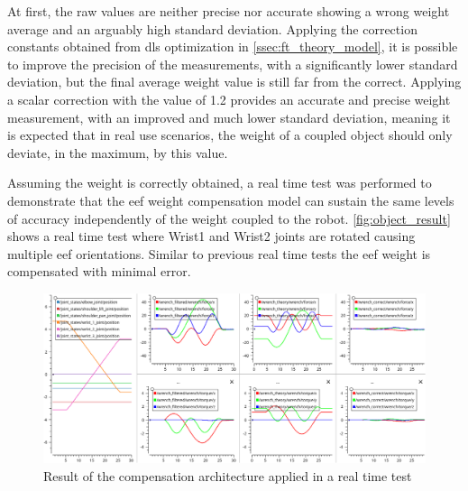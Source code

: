 \par At first, the raw values are neither precise nor accurate showing a wrong weight average and an arguably high standard deviation. Applying the correction constants obtained from \ac{dls} optimization in \autoref{ssec:ft_theory_model}, it is possible to improve the precision of the measurements, with a significantly lower standard deviation, but the final average weight value is still far from the correct. Applying a scalar correction with the value of 1.2 provides an accurate and precise weight measurement, with an improved and much lower standard deviation, meaning it is expected that in real use scenarios, the weight of a coupled object should only deviate, in the maximum, by this value.

\par Assuming the weight is correctly obtained, a real time test was performed to demonstrate that the \ac{eef} weight compensation model can sustain the same levels of accuracy independently of the weight coupled to the robot. \autoref{fig:object_result} shows a real time test where Wrist1 and Wrist2 joints are rotated causing multiple \ac{eef} orientations. Similar to previous real time tests the \ac{eef} weight is compensated with minimal error.

\begin{figure}[h]
    \centering
    \includegraphics[width=\linewidth]{figs/chp6/object_result.png}
    \caption{Result of the compensation architecture applied in a real time test}
    \label{fig:object_result}
\end{figure}

